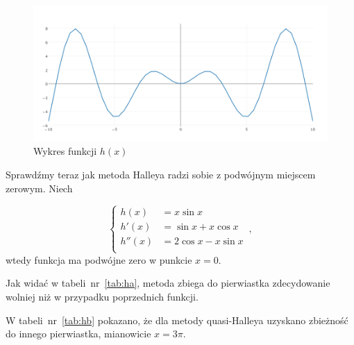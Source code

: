 \documentclass{article}
\begin{document}
    \begin{figure}
      \includegraphics[width=\linewidth]{hplot.png}
      \caption{Wykres funkcji $h(x)$}
      \label{fig:hplot}
    \end{figure}

    Sprawdźmy teraz jak metoda Halleya radzi sobie z podwójnym
    miejscem zerowym. Niech

    \begin{equation*}
      \begin{cases}
        h(x)   &= x\sin x  \\
        h'(x)  &= \sin x + x\cos x  \\
        h''(x) &= 2\cos x - x\sin x \\
      \end{cases}\,,
    \end{equation*}
    wtedy funkcja ma podwójne zero w punkcie $x = 0$.

    Jak widać w tabeli~nr~\ref{tab:ha}, metoda zbiega do pierwiastka
    zdecydowanie wolniej niż w przypadku poprzednich funkcji.

    W tabeli~nr~\ref{tab:hb} pokazano, że dla metody quasi-Halleya uzyskano
    zbieżność do innego pierwiastka, mianowicie $x = 3\pi$.
\end{document}
